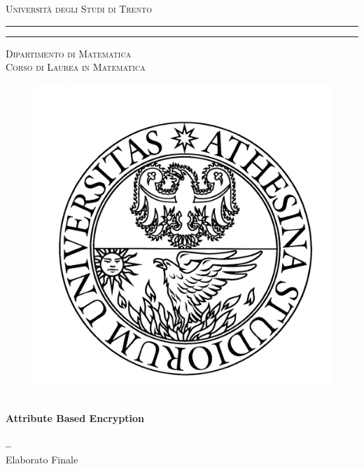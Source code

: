 \documentclass[a4paper,10pt, openany, oneside]{book}%
\theoremstyle{plain}%
\theoremstyle{definition}
\theoremstyle{remark}
\begin{document}
\frontmatter
\begin{titlepage}
\begin{center}
{{\Large{\textsc{Università degli Studi di Trento}}}}
\rule[0.1cm]{15.8cm}{0.1mm}
\rule[0.5cm]{15.8cm}{0.6mm}
{\small{\textsc { Dipartimento di Matematica \\
Corso di Laurea in Matematica}}}
\end{center}
\begin{center}
\begin{figure}[!htbp]
\includegraphics[scale=0.35]{unitn.jpg} \centering 
\centering
\end{figure}
\vspace{10mm}
\begin{center}
{\LARGE{\bf \-}}\\
\vspace{3mm}
{\LARGE\textbf{Attribute Based Encryption}}\\
\vspace{3mm}
{\LARGE{\bf \-}}\\
\vspace{3mm}
{\LARGE{\bf --}}\\
\vspace{7mm} {\large{\sc Elaborato Finale}}
\end{center}
\vfill
\par
\noindent

\end{center}
\end{titlepage}
\end{document}
